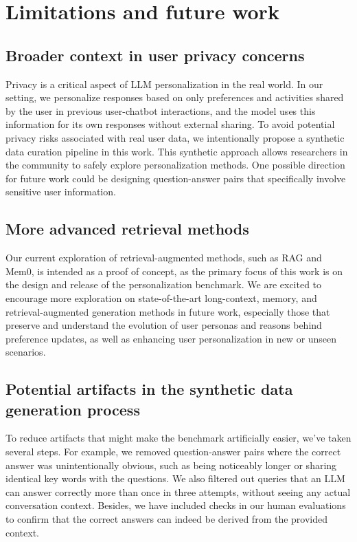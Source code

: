 \section{Limitations and future work}
\label{sec:limit}
\subsection{Broader context in user privacy concerns}
Privacy is a critical aspect of LLM personalization in the real world. In our setting, we personalize responses based on only preferences and activities shared by the user in previous user-chatbot interactions, and the model uses this information for its own responses without external sharing. To avoid potential privacy risks associated with real user data, we intentionally propose a synthetic data curation pipeline in this work. This synthetic approach allows researchers in the community to safely explore personalization methods. One possible direction for future work could be designing question-answer pairs that specifically involve sensitive user information.

\subsection{More advanced retrieval methods}
Our current exploration of retrieval-augmented methods, such as RAG and Mem0, is intended as a proof of concept, as the primary focus of this work is on the design and release of the personalization benchmark. We are excited to encourage more exploration on state-of-the-art long-context, memory, and retrieval-augmented generation methods in future work, especially those that preserve and understand the evolution of user personas and reasons behind preference updates, as well as enhancing user personalization in new or unseen scenarios.

\subsection{Potential artifacts in the synthetic data generation process}
To reduce artifacts that might make the benchmark artificially easier, we've taken several steps. For example, we removed question-answer pairs where the correct answer was unintentionally obvious, such as being noticeably longer or sharing identical key words with the questions. We also filtered out queries that an LLM can answer correctly more than once in three attempts, without seeing any actual conversation context. Besides, we have included checks in our human evaluations to confirm that the correct answers can indeed be derived from the provided context.

